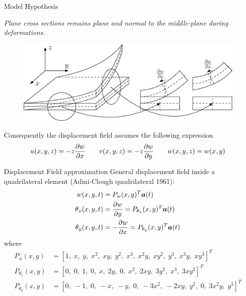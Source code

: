 \documentclass{beamer}
\begin{document}
\begin{frame}{Model Hypothesis}
\begin{tcolorbox}
	\textit{Plane cross sections remains plane and normal to the middle-plane during deformations.} 
	\begin{figure}
		\centering
		\includegraphics[height=0.4\textheight]{Kirchh_sketch.eps}
	\end{figure}	
\end{tcolorbox}

Consequently the displacement field assumes the following expression
\begin{equation*}
u(x,y,z) = -z \diffp{w}{x} \qquad v(x,y,z) = -z \diffp{w}{y} \qquad 
w(x,y,z) = w(x,y)
\end{equation*}
\end{frame}


\begin{frame}{Displacement Field approximation}
General displacement field inside a quadrilateral element (Adini-Clough quadrilateral 1961):
\begin{align*}
w(x,y,t) &= P_{w}(x,y)^T \bm{a}(t) \\
\theta_x(x,y,t) &= \diffp{w}{y} =  P_{\theta_x}(x,y)^T \bm{a}(t) \\
\theta_y(x,y,t) &= -\diffp{w}{x} =  P_{\theta_y}(x,y)^T \bm{a}(t)
\end{align*}
where
\begin{align*}
P_{w}(x,y) &= [1, \; x, \; y, \; x^2, \; xy, \; y^2, \; x^3, \; x^2 y , \; x y^2 , \; y^3 , \; x^3 y , \; x y^3]^T \\
P_{\theta_x}(x,y) &= [0, \; 0, \; 1, \; 0, \; x, \; 2y, \; 0, \; x^2 , \; 2 x y , \; 3y^2 , \; x^3 , \; 3 x y^2]^T \\
P_{\theta_y}(x,y) &= [0, \; -1, \; 0, \; -x, \; -y, \; 0, \; -3 x^2, \; -2 x y , \; y^2 , \; 0 , \; 3 x^2 y , \; y^3]^T \\
\end{align*}

\end{frame}
\end{document}
